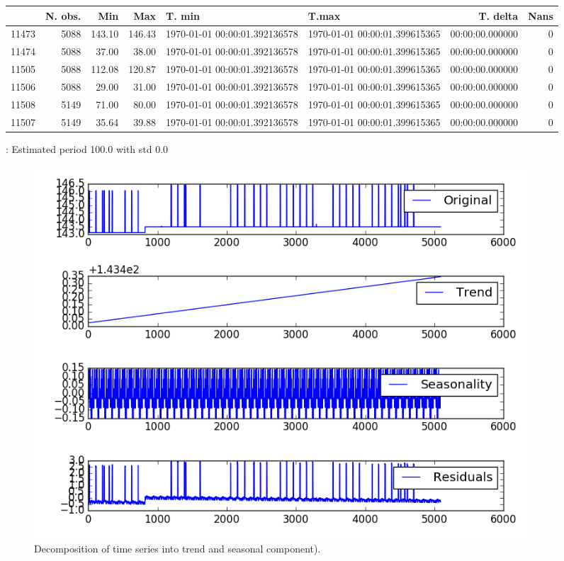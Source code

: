 \documentclass[12pt]{article}
\begin{document}
{\tiny 
 \begin{tabular}{lrrrllrr}
\toprule
{} &  N. obs. &     Min &     Max &                        T. min &                         T.max &        T. delta &  Nans \\
\midrule
11473 &     5088 &  143.10 &  146.43 & 1970-01-01 00:00:01.392136578 & 1970-01-01 00:00:01.399615365 & 00:00:00.000000 &     0 \\
11474 &     5088 &   37.00 &   38.00 & 1970-01-01 00:00:01.392136578 & 1970-01-01 00:00:01.399615365 & 00:00:00.000000 &     0 \\
11505 &     5088 &  112.08 &  120.87 & 1970-01-01 00:00:01.392136578 & 1970-01-01 00:00:01.399615365 & 00:00:00.000000 &     0 \\
11506 &     5088 &   29.00 &   31.00 & 1970-01-01 00:00:01.392136578 & 1970-01-01 00:00:01.399615365 & 00:00:00.000000 &     0 \\
11508 &     5149 &   71.00 &   80.00 & 1970-01-01 00:00:01.392136578 & 1970-01-01 00:00:01.399615365 & 00:00:00.000000 &     0 \\
11507 &     5149 &   35.64 &   39.88 & 1970-01-01 00:00:01.392136578 & 1970-01-01 00:00:01.399615365 & 00:00:00.000000 &     0 \\
\bottomrule
\end{tabular}

 }
 : Estimated period 100.0 with std 0.0 \\ 

\begin{figure}
\includegraphics[width=0.9\textwidth]{11473/decomposition.png}
\caption{Decomposition of time series into trend and seasonal component).} \label{fg:decomp}
\end{figure}
\end{document}
